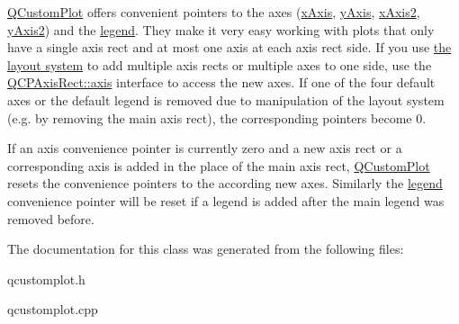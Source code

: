 \hyperlink{class_q_custom_plot}{Q\+Custom\+Plot} offers convenient pointers to the axes (\hyperlink{class_q_custom_plot_a9a79cd0158a4c7f30cbc702f0fd800e4}{x\+Axis}, \hyperlink{class_q_custom_plot_af6fea5679725b152c14facd920b19367}{y\+Axis}, \hyperlink{class_q_custom_plot_ada41599f22cad901c030f3dcbdd82fd9}{x\+Axis2}, \hyperlink{class_q_custom_plot_af13fdc5bce7d0fabd640f13ba805c0b7}{y\+Axis2}) and the \hyperlink{class_q_custom_plot_a4eadcd237dc6a09938b68b16877fa6af}{legend}. They make it very easy working with plots that only have a single axis rect and at most one axis at each axis rect side. If you use \hyperlink{}{the layout system} to add multiple axis rects or multiple axes to one side, use the \hyperlink{class_q_c_p_axis_rect_a583ae4f6d78b601b732183f6cabecbe1}{Q\+C\+P\+Axis\+Rect\+::axis} interface to access the new axes. If one of the four default axes or the default legend is removed due to manipulation of the layout system (e.\+g. by removing the main axis rect), the corresponding pointers become 0.

If an axis convenience pointer is currently zero and a new axis rect or a corresponding axis is added in the place of the main axis rect, \hyperlink{class_q_custom_plot}{Q\+Custom\+Plot} resets the convenience pointers to the according new axes. Similarly the \hyperlink{class_q_custom_plot_a4eadcd237dc6a09938b68b16877fa6af}{legend} convenience pointer will be reset if a legend is added after the main legend was removed before. 

The documentation for this class was generated from the following files\+:\begin{DoxyCompactItemize}
\item 
qcustomplot.\+h\item 
qcustomplot.\+cpp\end{DoxyCompactItemize}
